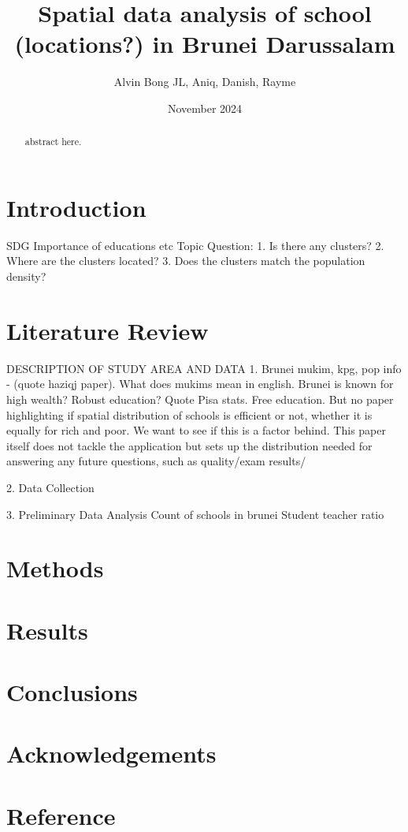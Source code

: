 \documentclass{article}
\title{Spatial data analysis of school (locations?) in Brunei Darussalam }
\author{Alvin Bong JL, Aniq, Danish, Rayme}
\date{November 2024}
\begin{document}
\maketitle

\begin{abstract}
    abstract here.
\end{abstract}

\section{Introduction}
SDG
Importance of educations etc
Topic Question:
	1. Is there any clusters?
	2. Where are the clusters located?
	3. Does the clusters match the population density?

\section{Literature Review}
DESCRIPTION OF STUDY AREA AND DATA
1.	Brunei mukim, kpg, pop info -  (quote haziqj paper). What does mukims mean in english.
Brunei is known for high wealth? Robust education? Quote Pisa stats. Free education. But no paper highlighting if spatial distribution of schools is efficient or not, whether it is equally for rich and poor. We want to see if this is a factor behind. This paper itself does not tackle the application but sets up the distribution needed for answering any future questions, such as quality/exam results/

2.	Data Collection

3.	Preliminary Data Analysis
Count of schools in brunei
Student teacher ratio

\section{Methods}

\section{Results}

\section{Conclusions}

\section{Acknowledgements}

\section{Reference}
\end{document}
